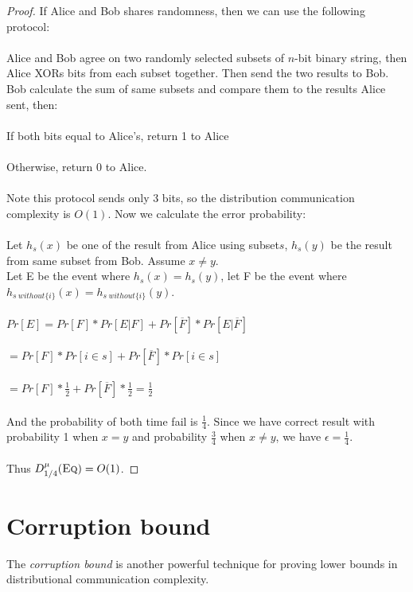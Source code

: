 \begin{proof}
	If Alice and Bob shares randomness, then we can use the following protocol:\\
	\\
	Alice and Bob agree on two randomly selected subsets of $n$-bit binary string, then Alice XORs bits from each subset together. Then send the two results to Bob. Bob calculate the sum of same subsets and compare them to the results Alice sent, then:\\ 
	\\
	If both bits equal to Alice's, return 1 to Alice\\
	\\
	Otherwise, return 0 to Alice.\\
	\\
	Note this protocol sends only 3 bits, so the distribution communication complexity is $O(1)$. Now we calculate the error probability: \\
	\\
	Let $h_s(x)$ be one of the result from Alice using subset$s$, $h_s(y)$ be the result from same subset from Bob. Assume $x \neq y$. \\
	Let E be the event where $h_s(x) = h_s(y)$, let F be the event where $h_{s\ without\{i\}}(x)=h_{s\ without\{i\}}(y)$.\\
	\\
	$Pr[E] = Pr[F]*Pr[E|F] + Pr[\overline{F}]*Pr[E|\overline{F}]$\\
	\\
	$=Pr[F]*Pr[i \in s] + Pr[\overline{F}]*Pr[i \in s]$\\
	\\
	$=Pr[F]*\frac12+Pr[\overline{F}]*\frac12 = \frac12$\\
	\\
	And the probability of both time fail is $\frac14$. Since we have correct result with probability 1 when $x = y$ and probability $\frac34$ when $x \neq y$, we have $\epsilon = \frac14$.\\ 
	\\
	Thus $D^\mu_{1/4}(\textsc{Eq}) = O(1)$.
\end{proof}



\section{Corruption bound}

The \emph{corruption bound} is another powerful technique for proving lower bounds in distributional communication complexity.


